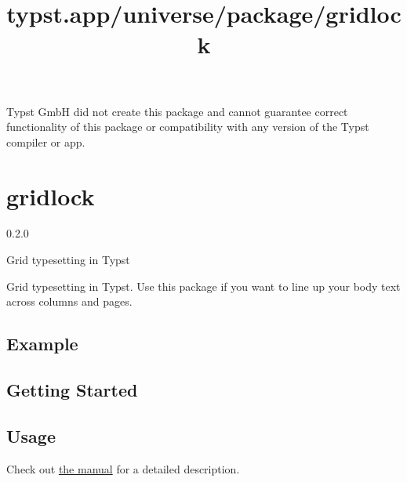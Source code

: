 Typst GmbH did not create this package and cannot guarantee correct
functionality of this package or compatibility with any version of the
Typst compiler or app.


\title{typst.app/universe/package/gridlock}

\label{banner}
\section{gridlock}\label{gridlock}

{ 0.2.0 }

Grid typesetting in Typst

\label{readme}
Grid typesetting in Typst. Use this package if you want to line up your
body text across columns and pages.

\subsection{Example}\label{example}


\subsection{Getting Started}\label{getting-started}

\begin{Shaded}
\begin{Highlighting}[]




\NormalTok{)}

\end{Highlighting}
\end{Shaded}

\subsection{Usage}\label{usage}

Check out
\href{https://github.com/typst/packages/raw/main/packages/preview/gridlock/0.2.0/docs/gridlock-manual.pdf}{the
manual} for a detailed description.

